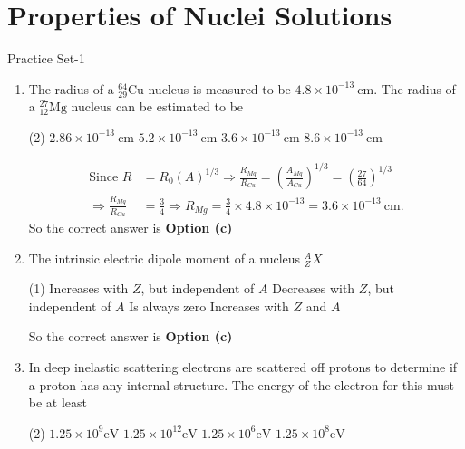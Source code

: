 \chapter{Properties of Nuclei Solutions}
\begin{abox}
	Practice Set-1
\end{abox}
\begin{enumerate}
	\item  The radius of a ${ }_{29}^{64} \mathrm{Cu}$ nucleus is measured to be $4.8 \times 10^{-13} \mathrm{~cm}$. The radius of a ${ }_{12}^{27} \mathrm{Mg}$ nucleus can be estimated to be
	\begin{tasks}(2)
		\task[\textbf{a.}]$2.86 \times 10^{-13} \mathrm{~cm}$
		\task[\textbf{b.}]$5.2 \times 10^{-13} \mathrm{~cm}$
		\task[\textbf{c.}] $3.6 \times 10^{-13} \mathrm{~cm}$
		\task[\textbf{d.}] $8.6 \times 10^{-13} \mathrm{~cm}$
	\end{tasks}
\begin{answer}
	\begin{align*}
\text{Since }R&=R_0(A)^{1 / 3} \Rightarrow \frac{R_{M g}}{R_{C u}}=\left(\frac{A_{M g}}{A_{C u}}\right)^{1 / 3}=\left(\frac{27}{64}\right)^{1 / 3}\\
	\Rightarrow \frac{R_{M g}}{R_{C u}}&=\frac{3}{4} \Rightarrow R_{M g}=\frac{3}{4} \times 4.8 \times 10^{-13}=3.6 \times 10^{-13} \mathrm{~cm} .
	\end{align*}
	So the correct answer is \textbf{Option (c)}
\end{answer}
	\item  The intrinsic electric dipole moment of a nucleus ${ }_Z^A X$
	\begin{tasks}(1)
		\task[\textbf{a.}]Increases with $Z$, but independent of $A$
		\task[\textbf{b.}]Decreases with $Z$, but independent of $A$
		\task[\textbf{c.}]Is always zero
		\task[\textbf{d.}]Increases with $Z$ and $A$
	\end{tasks}
\begin{answer}
So the correct answer is \textbf{Option (c)}
\end{answer}
	\item  In deep inelastic scattering electrons are scattered off protons to determine if a proton has any internal structure. The energy of the electron for this must be at least
	\begin{tasks}(2)
		\task[\textbf{a.}]$1.25 \times 10^9 \mathrm{eV}$
		\task[\textbf{b.}]$1.25 \times 10^{12} \mathrm{eV}$
		\task[\textbf{c.}] $1.25 \times 10^6 \mathrm{eV}$
		\task[\textbf{d.}] $1.25 \times 10^8 \mathrm{eV}$

\end{tasks}
\end{enumerate}
